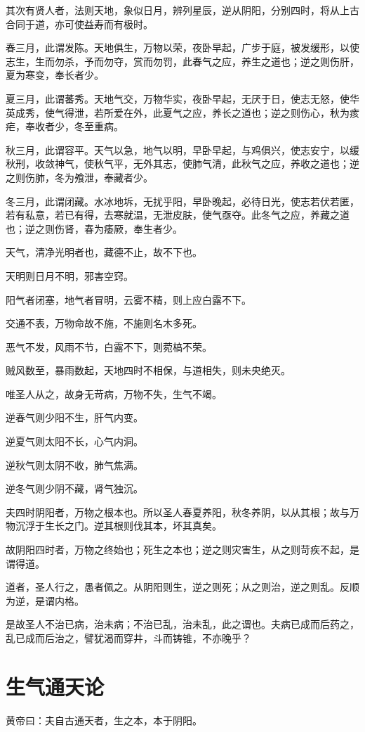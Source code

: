 \documentclass{article}%
\begin{document}
其次有贤人者，法则天地，象似日月，辨列星辰，逆从阴阳，分别四时，将从上古合同于道，亦可使益寿而有极时。

春三月，此谓发陈。天地俱生，万物以荣，夜卧早起，广步于庭，被发缓形，以使志生，生而勿杀，予而勿夺，赏而勿罚，此春气之应，养生之道也；逆之则伤肝，夏为寒变，奉长者少。

夏三月，此谓蕃秀。天地气交，万物华实，夜卧早起，无厌于日，使志无怒，使华英成秀，使气得泄，若所爱在外，此夏气之应，养长之道也；逆之则伤心，秋为痎疟，奉收者少，冬至重病。

秋三月，此谓容平。天气以急，地气以明，早卧早起，与鸡俱兴，使志安宁，以缓秋刑，收敛神气，使秋气平，无外其志，使肺气清，此秋气之应，养收之道也；逆之则伤肺，冬为飧泄，奉藏者少。

冬三月，此谓闭藏。水冰地坼，无扰乎阳，早卧晚起，必待日光，使志若伏若匿，若有私意，若已有得，去寒就温，无泄皮肤，使气亟夺。此冬气之应，养藏之道也；逆之则伤肾，春为痿厥，奉生者少。

天气，清净光明者也，藏德不止，故不下也。

天明则日月不明，邪害空窍。

阳气者闭塞，地气者冒明，云雾不精，则上应白露不下。

交通不表，万物命故不施，不施则名木多死。

恶气不发，风雨不节，白露不下，则菀槁不荣。

贼风数至，暴雨数起，天地四时不相保，与道相失，则未央绝灭。

唯圣人从之，故身无苛病，万物不失，生气不竭。

逆春气则少阳不生，肝气内变。

逆夏气则太阳不长，心气内洞。

逆秋气则太阴不收，肺气焦满。

逆冬气则少阴不藏，肾气独沉。

夫四时阴阳者，万物之根本也。所以圣人春夏养阳，秋冬养阴，以从其根；故与万物沉浮于生长之门。逆其根则伐其本，坏其真矣。

故阴阳四时者，万物之终始也；死生之本也；逆之则灾害生，从之则苛疾不起，是谓得道。

道者，圣人行之，愚者佩之。从阴阳则生，逆之则死；从之则治，逆之则乱。反顺为逆，是谓内格。

是故圣人不治已病，治未病；不治已乱，治未乱，此之谓也。夫病已成而后药之，乱已成而后治之，譬犹渴而穿井，斗而铸锥，不亦晚乎？
\section{生气通天论}
黄帝曰：夫自古通天者，生之本，本于阴阳。
\end{document}
